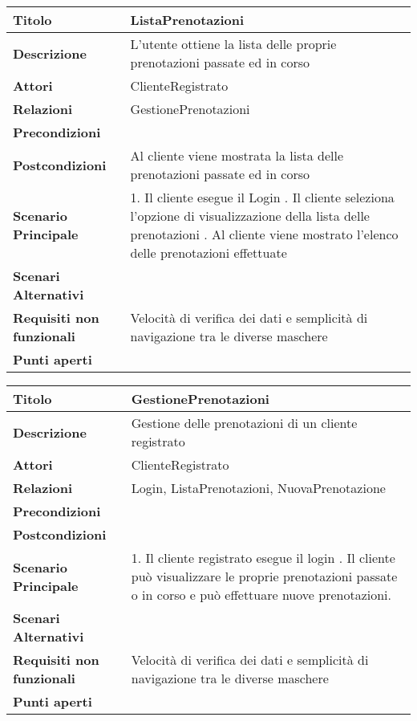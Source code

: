 \begin{tabular} {|P{4.5cm}|P{12.5cm}|}
\hline
  \textbf{Titolo} & ListaPrenotazioni\\
\hline
  \textbf{Descrizione} & L'utente ottiene la lista delle proprie prenotazioni passate ed in corso\\
\hline
 \textbf{Attori} & ClienteRegistrato\\
\hline
  \textbf{Relazioni} & GestionePrenotazioni\\
\hline
  \textbf{Precondizioni} &\\
\hline
  \textbf{Postcondizioni} & Al cliente viene mostrata la lista delle prenotazioni passate ed in corso\\
\hline
  \textbf{Scenario Principale} & 1. Il cliente esegue il Login . Il cliente seleziona l'opzione di visualizzazione della lista delle prenotazioni . Al cliente viene mostrato l'elenco delle prenotazioni effettuate\\
\hline
  \textbf{Scenari Alternativi} &\\
\hline
  \textbf{Requisiti non funzionali} & Velocità di verifica dei dati e semplicità di navigazione tra le diverse maschere\\
\hline
  \textbf{Punti aperti} &\\
\hline
\end{tabular}
\hfill
\break


\begin{tabular} {|P{4.5cm}|P{12.5cm}|}
\hline
  \textbf{Titolo} & GestionePrenotazioni\\
\hline
  \textbf{Descrizione} & Gestione delle prenotazioni di un cliente registrato\\
\hline
  \textbf{Attori} & ClienteRegistrato\\
\hline
  \textbf{Relazioni} & Login, ListaPrenotazioni, NuovaPrenotazione\\
\hline
  \textbf{Precondizioni} &\\
\hline
  \textbf{Postcondizioni} &\\
\hline
  \textbf{Scenario Principale} & 1. Il cliente registrato esegue il login . Il cliente può visualizzare le proprie prenotazioni passate o in corso e può effettuare nuove prenotazioni.\\
\hline
  \textbf{Scenari Alternativi} &\\
\hline
  \textbf{Requisiti non funzionali} & Velocità di verifica dei dati e semplicità di navigazione tra le diverse maschere\\
\hline
  \textbf{Punti aperti} &\\
\hline
\end{tabular}


